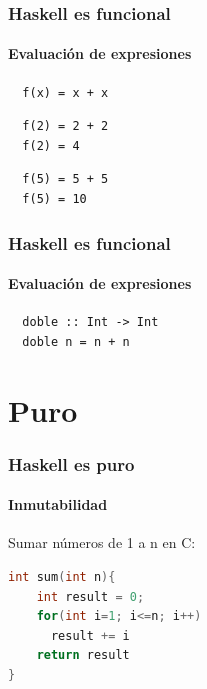 \documentclass{beamer}
\begin{document}

\begin{frame}[fragile]
  \frametitle{Haskell es funcional}
  \framesubtitle{Evaluación de expresiones}

\begin{verbatim}
  f(x) = x + x
\end{verbatim}
\vspace{-0.5cm}
\begin{verbatim}
  f(2) = 2 + 2
  f(2) = 4 
\end{verbatim}
\vspace{-0.8cm}
\color{blue} 
\begin{verbatim}
  f(5) = 5 + 5
  f(5) = 10 
\end{verbatim}

\end{frame}


\begin{frame}[fragile]
  \frametitle{Haskell es funcional}
  \framesubtitle{Evaluación de expresiones}

\begin{lstlisting}
  doble :: Int -> Int 
  doble n = n + n
\end{lstlisting}


\end{frame}


\section{Puro}

\begin{frame}[fragile]
  \frametitle{Haskell es puro}
  \framesubtitle{Inmutabilidad}

Sumar números de 1 a n en C: 

\begin{lstlisting}[language=c]
int sum(int n){
	int result = 0;
	for(int i=1; i<=n; i++)
	  result += i
	return result
}
\end{lstlisting}

\end{frame}

\end{document}
